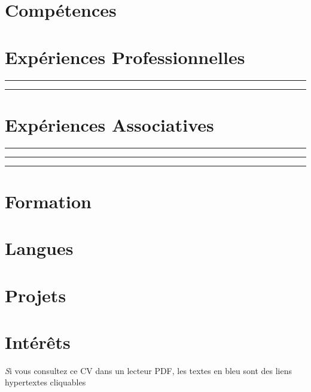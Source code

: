 \documentclass[
  a4paper
  fontsize=10pt
]{resumeats}
\begin{document}



\makeheader

\section{Compétences}

\bigskip

\section{Expériences Professionnelles}



\textcolor{endrules}{\rule{\linewidth}{0.5pt}}



\textcolor{endrules}{\rule{\linewidth}{0.5pt}}




\newpage




\bigskip
\section[\fa{cogs}]{Expériences Associatives}

\textcolor{endrules}{\rule{\linewidth}{0.5pt}}

\textcolor{endrules}{\rule{\linewidth}{0.5pt}}

\textcolor{endrules}{\rule{\linewidth}{0.5pt}}


\bigskip
\section{Formation}


\bigskip
\section{Langues}



\bigskip
\section[\nerdfont]{Projets}


\bigskip
\section{Intérêts}


\begin{center}
  \vfill
  \scriptsize
  {
    \textit
    Si vous consultez ce CV dans un lecteur PDF, {\color{blue-800}les textes en
        bleu} sont des liens hypertextes cliquables
  }
\end{center}
\end{document}
